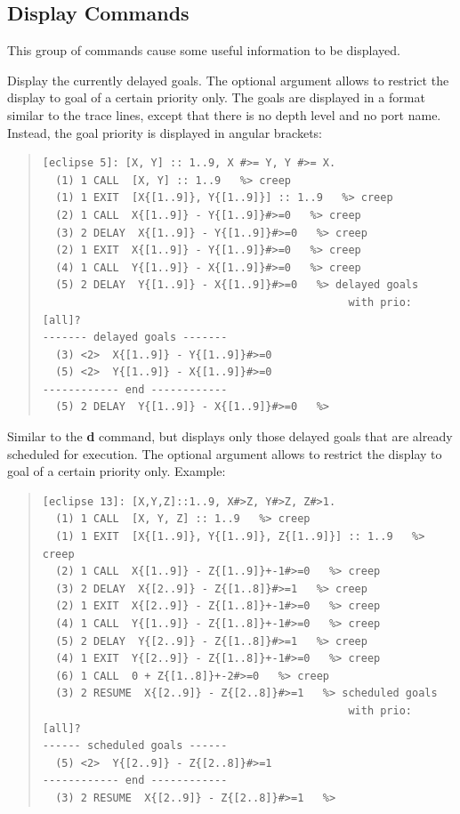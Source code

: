 \subsection{Display Commands}
This group of commands cause some useful information to be displayed.

\begin{descr}{1cm}

Display the currently delayed goals. The optional argument allows
to restrict the display to goal of a certain priority only.
The goals are displayed in a format similar to the trace lines,
except that there is no depth level and no port name.
Instead, the goal priority is displayed in angular brackets:
\begin{quote}\begin{verbatim}
[eclipse 5]: [X, Y] :: 1..9, X #>= Y, Y #>= X.
  (1) 1 CALL  [X, Y] :: 1..9   %> creep
  (1) 1 EXIT  [X{[1..9]}, Y{[1..9]}] :: 1..9   %> creep
  (2) 1 CALL  X{[1..9]} - Y{[1..9]}#>=0   %> creep
  (3) 2 DELAY  X{[1..9]} - Y{[1..9]}#>=0   %> creep
  (2) 1 EXIT  X{[1..9]} - Y{[1..9]}#>=0   %> creep
  (4) 1 CALL  Y{[1..9]} - X{[1..9]}#>=0   %> creep
  (5) 2 DELAY  Y{[1..9]} - X{[1..9]}#>=0   %> delayed goals
                                                with prio: [all]? 
------- delayed goals -------
  (3) <2>  X{[1..9]} - Y{[1..9]}#>=0
  (5) <2>  Y{[1..9]} - X{[1..9]}#>=0
------------ end ------------
  (5) 2 DELAY  Y{[1..9]} - X{[1..9]}#>=0   %> 
\end{verbatim}\end{quote}

Similar to the {\bf d} command, but displays only those delayed goals
that are already scheduled for execution.
The optional argument allows
to restrict the display to goal of a certain priority only. Example:
\begin{quote}\begin{verbatim}
[eclipse 13]: [X,Y,Z]::1..9, X#>Z, Y#>Z, Z#>1.
  (1) 1 CALL  [X, Y, Z] :: 1..9   %> creep
  (1) 1 EXIT  [X{[1..9]}, Y{[1..9]}, Z{[1..9]}] :: 1..9   %> creep
  (2) 1 CALL  X{[1..9]} - Z{[1..9]}+-1#>=0   %> creep
  (3) 2 DELAY  X{[2..9]} - Z{[1..8]}#>=1   %> creep
  (2) 1 EXIT  X{[2..9]} - Z{[1..8]}+-1#>=0   %> creep
  (4) 1 CALL  Y{[1..9]} - Z{[1..8]}+-1#>=0   %> creep
  (5) 2 DELAY  Y{[2..9]} - Z{[1..8]}#>=1   %> creep
  (4) 1 EXIT  Y{[2..9]} - Z{[1..8]}+-1#>=0   %> creep
  (6) 1 CALL  0 + Z{[1..8]}+-2#>=0   %> creep
  (3) 2 RESUME  X{[2..9]} - Z{[2..8]}#>=1   %> scheduled goals
                                                with prio: [all]? 
------ scheduled goals ------
  (5) <2>  Y{[2..9]} - Z{[2..8]}#>=1
------------ end ------------
  (3) 2 RESUME  X{[2..9]} - Z{[2..8]}#>=1   %> 
\end{verbatim}\end{quote}


\end{descr}
